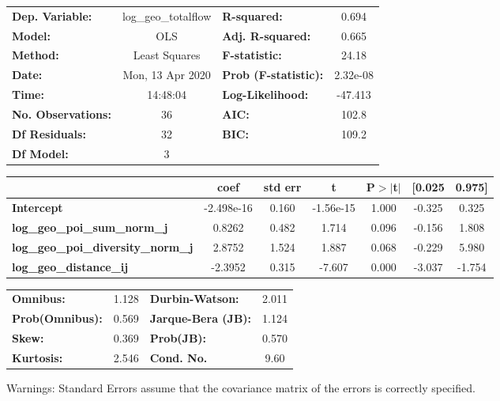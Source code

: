 \begin{center}
\begin{tabular}{lclc}
\toprule
\textbf{Dep. Variable:}                    & log\_geo\_totalflow & \textbf{  R-squared:         } &     0.694   \\
\textbf{Model:}                            &         OLS         & \textbf{  Adj. R-squared:    } &     0.665   \\
\textbf{Method:}                           &    Least Squares    & \textbf{  F-statistic:       } &     24.18   \\
\textbf{Date:}                             &   Mon, 13 Apr 2020  & \textbf{  Prob (F-statistic):} &  2.32e-08   \\
\textbf{Time:}                             &       14:48:04      & \textbf{  Log-Likelihood:    } &   -47.413   \\
\textbf{No. Observations:}                 &            36       & \textbf{  AIC:               } &     102.8   \\
\textbf{Df Residuals:}                     &            32       & \textbf{  BIC:               } &     109.2   \\
\textbf{Df Model:}                         &             3       & \textbf{                     } &             \\
\bottomrule
\end{tabular}
\begin{tabular}{lcccccc}
                                           & \textbf{coef} & \textbf{std err} & \textbf{t} & \textbf{P$> |$t$|$} & \textbf{[0.025} & \textbf{0.975]}  \\
\midrule
\textbf{Intercept}                         &   -2.498e-16  &        0.160     & -1.56e-15  &         1.000        &       -0.325    &        0.325     \\
\textbf{log\_geo\_poi\_sum\_norm\_j}       &       0.8262  &        0.482     &     1.714  &         0.096        &       -0.156    &        1.808     \\
\textbf{log\_geo\_poi\_diversity\_norm\_j} &       2.8752  &        1.524     &     1.887  &         0.068        &       -0.229    &        5.980     \\
\textbf{log\_geo\_distance\_ij}            &      -2.3952  &        0.315     &    -7.607  &         0.000        &       -3.037    &       -1.754     \\
\bottomrule
\end{tabular}
\begin{tabular}{lclc}
\textbf{Omnibus:}       &  1.128 & \textbf{  Durbin-Watson:     } &    2.011  \\
\textbf{Prob(Omnibus):} &  0.569 & \textbf{  Jarque-Bera (JB):  } &    1.124  \\
\textbf{Skew:}          &  0.369 & \textbf{  Prob(JB):          } &    0.570  \\
\textbf{Kurtosis:}      &  2.546 & \textbf{  Cond. No.          } &     9.60  \\
\bottomrule
\end{tabular}
\end{center}

Warnings: \newline
 [1] Standard Errors assume that the covariance matrix of the errors is correctly specified.
